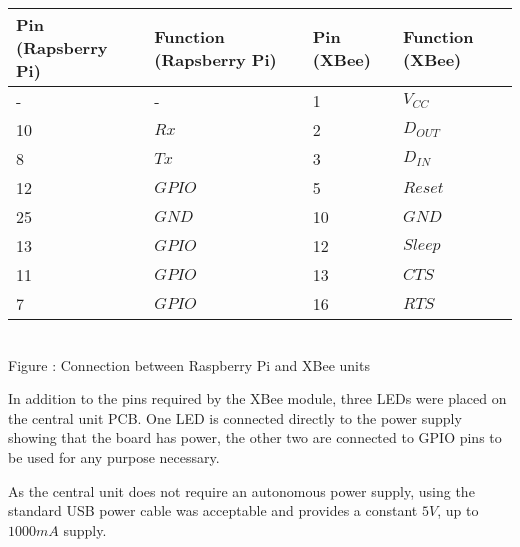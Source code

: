 \begin{center}
  \begin{tabular}{| l | l | l | l |}
    \hline
    \bf{Pin (Rapsberry Pi)} & \bf{Function (Rapsberry Pi)} & \bf{Pin (XBee)} & \bf{Function (XBee)} \\ \hline
     - & - & 1 & \(V_{CC}\) \\ \hline
	10 & \(Rx\) & 2 & \(D_{OUT}\) \\ \hline
	8 & \(Tx\) & 3 & \(D_{IN}\) \\ \hline
	12 & \(GPIO\) & 5 & \(Reset\) \\ \hline
	25 & \(GND\) & 10 & \(GND\) \\ \hline
	13 & \(GPIO\) & 12 & \(Sleep\) \\ \hline
	11 & \(GPIO\) & 13 & \(CTS\) \\ \hline
	7 & \(GPIO\) & 16 & \(RTS\) \\
    \hline
  \end{tabular}
\label{interfacePiXBee}\\
Figure : Connection between Raspberry Pi and XBee units
\end{center}

In addition to the pins required by the XBee module, three LEDs were placed on the central unit PCB. One LED is connected directly to the power supply showing that the board has power, the other two are connected to GPIO pins to be used for any purpose necessary.

As the central unit does not require an autonomous power supply, using the standard USB power cable was acceptable and provides a constant $5\unit{V}$, up to $1000\unit{mA}$ supply.
